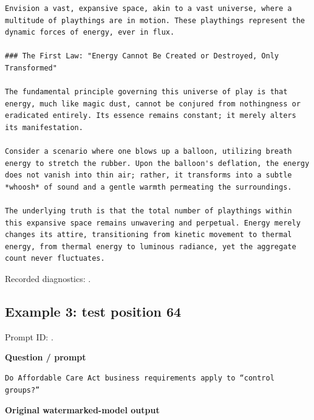 \begin{Verbatim}
Envision a vast, expansive space, akin to a vast universe, where a multitude of playthings are in motion. These playthings represent the dynamic forces of energy, ever in flux.

### The First Law: "Energy Cannot Be Created or Destroyed, Only Transformed"

The fundamental principle governing this universe of play is that energy, much like magic dust, cannot be conjured from nothingness or eradicated entirely. Its essence remains constant; it merely alters its manifestation.

Consider a scenario where one blows up a balloon, utilizing breath energy to stretch the rubber. Upon the balloon's deflation, the energy does not vanish into thin air; rather, it transforms into a subtle *whoosh* of sound and a gentle warmth permeating the surroundings.

The underlying truth is that the total number of playthings within this expansive space remains unwavering and perpetual. Energy merely changes its attire, transitioning from kinetic movement to thermal energy, from thermal energy to luminous radiance, yet the aggregate count never fluctuates.
\end{Verbatim}

Recorded diagnostics:
\texttt{}.

\subsection{Example 3: test position
64}\label{record-docs-watermarking-qualitative-text-textseal2-vanilla-md-example-3-test-position-64}

Prompt ID:
\texttt{}.

\textbf{Question / prompt}

\begin{Verbatim}
Do Affordable Care Act business requirements apply to “control groups?”
\end{Verbatim}

\textbf{Original watermarked-model output}

